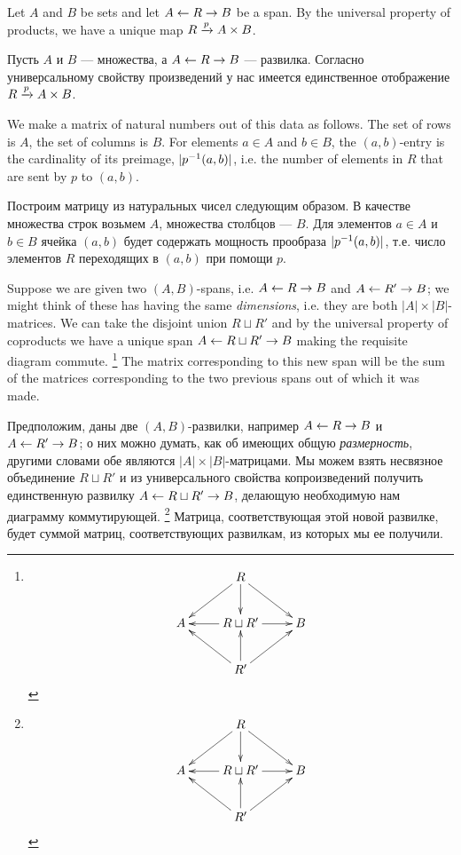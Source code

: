 \begin{blockENG}
Let $A$ and $B$ be sets and let $A\leftarrow R\rightarrow B$ be a span. By the universal property of products, we have a unique map $R\xrightarrow{p}A\times B$. 
\end{blockENG}

\begin{blockRUS}
Пусть $A$ и $B$ — множества, а $A\leftarrow R\rightarrow B$ — развилка. Согласно универсальному свойству произведений у нас имеется единственное отображение $R\xrightarrow{p}A\times B$. 
\end{blockRUS}

\begin{blockENG}
We make a matrix of natural numbers out of this data as follows. The set of rows is $A$, the set of columns is $B$. For elements $a\in A$ and $b\in B$, the $(a,b)$-entry is the cardinality of its preimage, $|p^\m1(a,b)|$, i.e. the number of elements in $R$ that are sent by $p$ to $(a,b)$. 
\end{blockENG}

\begin{blockRUS}
Построим матрицу из натуральных чисел следующим образом. В качестве множества строк возьмем $A$, множества столбцов — $B$. Для элементов $a\in A$ и $b\in B$ ячейка $(a,b)$ будет содержать мощность прообраза $|p^\m1(a,b)|$, т.е. число элементов $R$ переходящих в $(a,b)$ при помощи $p$. 
\end{blockRUS}

\begin{blockENG}
Suppose we are given two $(A,B)$-spans, i.e. $A\leftarrow R\rightarrow B$ and $A\leftarrow R'\rightarrow B$; we might think of these has having the same {\em dimensions}, i.e. they are both $|A|\times|B|$-matrices. We can take the disjoint union $R\sqcup R'$ and by the universal property of coproducts we have a unique span $A\leftarrow R\sqcup R'\rightarrow B$ making the requisite diagram commute.%
\footnote{
$$\xymatrix{
&R\ar[dl]\ar[dr]\ar[d]\\
A&R\sqcup R'\ar[l]\ar[r]&B\\
&R'\ar[ur]\ar[ul]\ar[u]}
$$
}
The matrix corresponding to this new span will be the sum of the matrices corresponding to the two previous spans out of which it was made.
\end{blockENG}

\begin{blockRUS}
Предположим, даны две $(A,B)$-развилки, например $A\leftarrow R\rightarrow B$ и $A\leftarrow R'\rightarrow B$; о них можно думать, как об имеющих общую {\em размерность}, другими словами обе являются $|A|\times|B|$-матрицами. Мы можем взять несвязное объединение $R\sqcup R'$ и из универсального свойства копроизведений получить единственную развилку $A\leftarrow R\sqcup R'\rightarrow B$, делающую необходимую нам диаграмму коммутирующей.%
\footnote{
$$\xymatrix{
&R\ar[dl]\ar[dr]\ar[d]\\
A&R\sqcup R'\ar[l]\ar[r]&B\\
&R'\ar[ur]\ar[ul]\ar[u]}
$$
}
Матрица, соответствующая этой новой развилке, будет суммой матриц, соответствующих развилкам, из которых мы ее получили.
\end{blockRUS}

